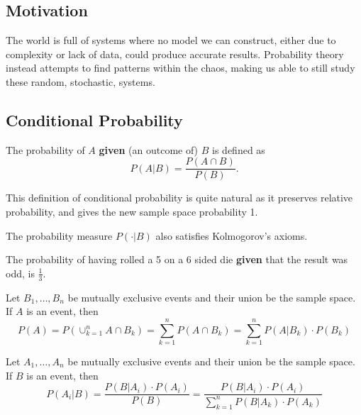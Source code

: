 \subsection{Motivation}
The world is full of systems where no model we can construct, either due to complexity or lack of data, could produce accurate results. Probability theory instead attempts to find patterns within the chaos, making us able to still study these random, stochastic, systems.


\subsection{Conditional Probability}


\begin{definition}
	The probability of \(A\) \textbf{given} (an outcome of) \(B\) is defined as
	\[
		P(A|B) = \frac{P(A \cap B)}{P(B)}.
	\]
\end{definition}

\begin{obs}
	This definition of conditional probability is quite natural as it preserves relative probability, and gives the new sample space probability 1.
\end{obs}

\begin{obs}
	The probability measure \(P( \cdot | B)\) also satisfies Kolmogorov's axioms.
\end{obs}

\begin{example}
	The probability of having rolled a 5 on a 6 sided die \textbf{given} that the result was odd, is \(\frac{1}{3}\).
\end{example}

\begin{theorem}
	Let \(B_1, \dots, B_n\) be mutually exclusive events and their union be the sample space. If \(A\) is an event, then
	\[
		P(A) = P(\cup _{k=1} ^{n} A \cap B_k) = \sum_{k=1}^{n} P(A \cap B _k) =  \sum_{k=1}^{n} P(A|B_k)  \cdot P(B_k)
	\]
\end{theorem}


\begin{theorem}
	Let \(A_1, \dots, A_n\) be mutually exclusive events and their union be the sample space. If \(B\) is an event, then
	\[
		P(A_i|B) = \frac{P(B|A_i) \cdot P(A_i)}{P(B)} = \frac{P(B|A_i) \cdot P(A_i)}{\sum_{k=1}^{n} P(B|A_k)  \cdot P(A_k)}  
	\]
\end{theorem}

